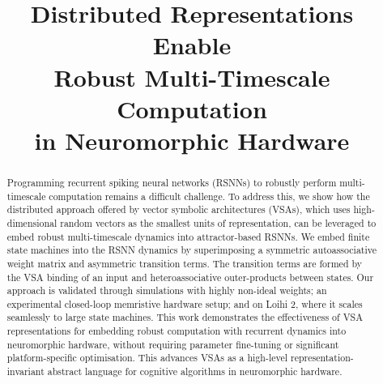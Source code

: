 
\title{Distributed Representations Enable\\Robust Multi-Timescale Computation\\in Neuromorphic Hardware}
\maketitle

\thispagestyle{plain}
\pagestyle{plain}



\begin{abstract}
Programming recurrent spiking neural networks (RSNNs) to robustly perform multi-timescale computation remains a difficult challenge.
To address this, we show how the distributed approach offered by vector symbolic architectures (VSAs), which uses high-dimensional random vectors as the smallest units of representation, can be leveraged to embed robust multi-timescale dynamics into attractor-based RSNNs.
We embed finite state machines into the RSNN dynamics by superimposing a symmetric autoassociative weight matrix and asymmetric transition terms. The transition terms are formed by the VSA binding of an input and heteroassociative outer-products between states.
Our approach is validated through simulations with highly non-ideal weights; an experimental closed-loop memristive hardware setup; and on Loihi 2, where it scales seamlessly to large state machines. This work demonstrates the effectiveness of VSA representations for embedding robust computation with recurrent dynamics into neuromorphic hardware, without requiring parameter fine-tuning or significant platform-specific optimisation. This advances VSAs as a high-level representation-invariant abstract language for cognitive algorithms in neuromorphic hardware.


\vspace{1em}

\end{abstract}


